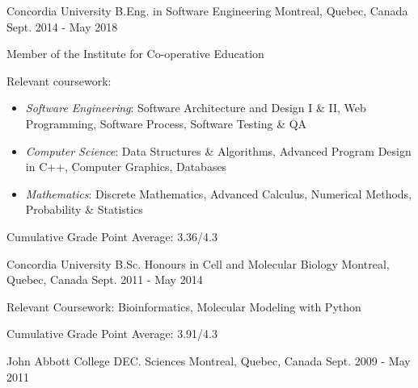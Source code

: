 

\begin{cventries}

  \cventry
  {\small Concordia University} %
  {\normalsize B.Eng. in Software Engineering} %
  {\small Montreal, Quebec, Canada} %
  {\small Sept. 2014 - May 2018} %
  {
    \begin{cvitems} %
    \item {\small Member of the Institute for Co-operative Education}
    \item {\small Relevant coursework:}
      \begin{itemize}
        \item \small \textit{Software Engineering}: Software Architecture and Design I \& II, Web Programming, Software Process, Software Testing \& QA
        \item \small \textit{Computer Science}: Data Structures \& Algorithms, Advanced Program Design in C++, Computer Graphics, Databases
        \item \small \textit{Mathematics}: Discrete Mathematics, Advanced Calculus, Numerical Methods, Probability \& Statistics
    \end{itemize}
  \item {\small Cumulative Grade Point Average: 3.36/4.3}
    \end{cvitems}
  }

  \cventry
  {\small Concordia University} %
  {\normalsize B.Sc. Honours in Cell and Molecular Biology} %
  {\small Montreal, Quebec, Canada} %
  {\small Sept. 2011 - May 2014} %
  {
    \begin{cvitems} %
    \item {\small Relevant Coursework: Bioinformatics, Molecular Modeling with Python }
    \item {\small Cumulative Grade Point Average: 3.91/4.3}
    \end{cvitems}
  }

  \cventry
  {\small John Abbott College} %
  {\normalsize DEC. Sciences} %
  {\small Montreal, Quebec, Canada} %
  {\small Sept. 2009 - May 2011} %
  {
  }

  \vspace{-3mm}

\end{cventries}
